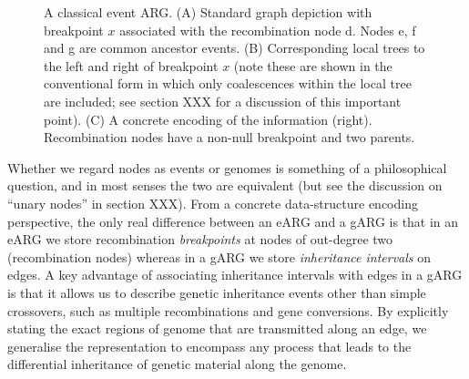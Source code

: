 \documentclass{article}
\newcommand{\noderef}[1]{\textsf{#1}}
\begin{document}
\begin{figure}
\caption{\label{fig-event-arg}
A classical event ARG. (A) Standard graph depiction with
breakpoint $x$ associated with the recombination node \noderef{d}.
Nodes \noderef{e}, \noderef{f} and \noderef{g} are common ancestor events.
(B) Corresponding local trees to the left and right of breakpoint $x$
(note these are shown in the conventional form in which only coalescences
within the local tree are included; see section XXX for a discussion
of this important point).
(C) A concrete encoding of the information (right).
Recombination nodes have a non-null breakpoint
and two parents.
}
\end{figure}

Whether we regard nodes as events or genomes is something of a
philosophical question, and in most senses the two are equivalent
(but see the discussion on ``unary nodes'' in section XXX).
From a concrete data-structure encoding perspective, the only real
difference between an eARG and a gARG is that in an eARG we store recombination
\emph{breakpoints} at nodes of out-degree two (recombination nodes)
whereas in a gARG we store \emph{inheritance intervals} on edges.
A key advantage of associating inheritance intervals with
edges in a gARG is that it allows us to describe genetic inheritance events other
than simple crossovers, such as multiple recombinations and
gene conversions. By explicitly stating the exact regions of genome
that are transmitted along an edge, we generalise the representation
to encompass any process that leads to the differential inheritance of
genetic material along the genome.
\end{document}

